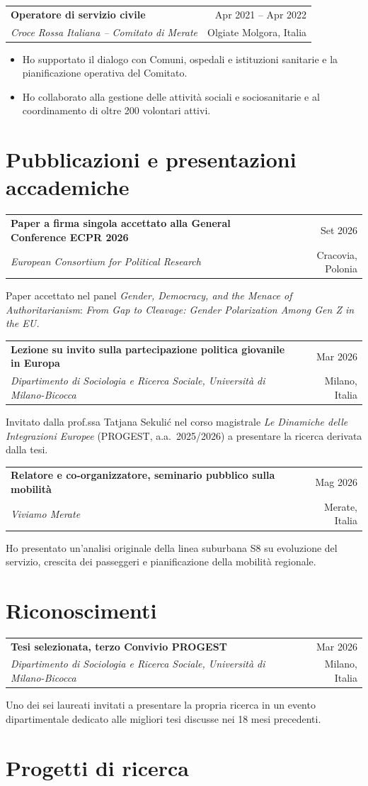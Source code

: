 \documentclass[11pt,a4paper]{article}
\makeatletter
\newcommand{\cventry}[4]{%
  \begin{tabularx}{\textwidth}{@{}Xr@{}}
    {\textbf{#1}} & {#4}\\
    {\emph{#2}} & {#3}
  \end{tabularx}\vspace{0.2em}
}
\makeatother
\begin{document}
\cventry{Operatore di servizio civile}{Croce Rossa Italiana -- Comitato di Merate}{Olgiate Molgora, Italia}{Apr 2021 -- Apr 2022}
\begin{itemize}
  \item Ho supportato il dialogo con Comuni, ospedali e istituzioni sanitarie e la pianificazione operativa del Comitato.
  \item Ho collaborato alla gestione delle attività sociali e sociosanitarie e al coordinamento di oltre 200 volontari attivi.
\end{itemize}

\newpage
\section*{Pubblicazioni e presentazioni accademiche}

\cventry{Paper a firma singola accettato alla General Conference ECPR 2026}{European Consortium for Political Research}{Cracovia, Polonia}{Set 2026}
Paper accettato nel panel \emph{Gender, Democracy, and the Menace of Authoritarianism}: \emph{From Gap to Cleavage: Gender Polarization Among Gen Z in the EU.}

\cventry{Lezione su invito sulla partecipazione politica giovanile in Europa}{Dipartimento di Sociologia e Ricerca Sociale, Università di Milano-Bicocca}{Milano, Italia}{Mar 2026}
Invitato dalla prof.ssa Tatjana Sekulić nel corso magistrale \emph{Le Dinamiche delle Integrazioni Europee} (PROGEST, a.a.~2025/2026) a presentare la ricerca derivata dalla tesi.

\cventry{Relatore e co-organizzatore, seminario pubblico sulla mobilità}{Viviamo Merate}{Merate, Italia}{Mag 2026}
Ho presentato un'analisi originale della linea suburbana S8 su evoluzione del servizio, crescita dei passeggeri e pianificazione della mobilità regionale.

\section*{Riconoscimenti}

\cventry{Tesi selezionata, terzo Convivio PROGEST}{Dipartimento di Sociologia e Ricerca Sociale, Università di Milano-Bicocca}{Milano, Italia}{Mar 2026}
Uno dei sei laureati invitati a presentare la propria ricerca in un evento dipartimentale dedicato alle migliori tesi discusse nei 18 mesi precedenti.

\section*{Progetti di ricerca}
\end{document}
